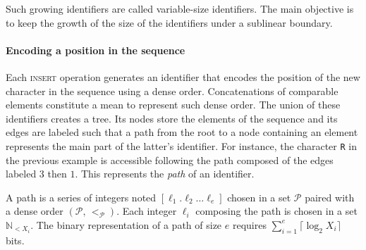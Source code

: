
Such growing identifiers are called variable-size identifiers. The main
objective is to keep the growth of the size of the identifiers under a sublinear
boundary.

\paragraph{Encoding a position in the sequence}
Each \textsc{insert} operation generates an identifier that encodes the position
of the new character in the sequence using a dense order. Concatenations of
comparable elements constitute a mean to represent such dense order.
The union of these identifiers creates a tree. Its nodes store the elements of
the sequence and its edges are labeled such that a path from the root to a node
containing an element represents the main part of the latter's identifier. For
instance, the character \texttt{R} in the previous example is accessible
following the path composed of the edges labeled $3$ then $1$.  This represents
the \emph{path} of an identifier.



\begin{definition}[Path]
  A path is a series of integers noted $[\ell_1.\ell_2\ldots \ell_e]$ chosen in a
  set $\mathcal{P}$ paired with a dense order $(\mathcal{P},\, <_\mathcal{P})$.
  Each integer $\ell_i$ composing the path is chosen in a set
  $\mathbb{N}_{<X_i}$. The binary representation of a path of size $e$ requires
  $\textstyle \sum\nolimits_{i=1}^e \lceil \log_2 X_i\rceil$ bits.
\end{definition}


